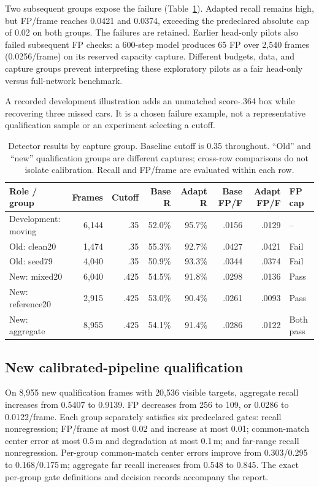 \documentclass[conference]{IEEEtran}
\begin{document}
Two subsequent groups expose the failure (Table~\ref{tab:detector}). Adapted recall remains high, but FP/frame reaches 0.0421 and 0.0374, exceeding the predeclared absolute cap of 0.02 on both groups. The failures are retained. Earlier head-only pilots also failed subsequent FP checks: a 600-step model produces 65 FP over 2,540 frames (0.0256/frame) on its reserved capacity capture. Different budgets, data, and capture groups prevent interpreting these exploratory pilots as a fair head-only versus full-network benchmark.

A recorded development illustration adds an unmatched score-.364 box while recovering three missed cars. It is a chosen failure example, not a representative qualification sample or an experiment selecting a cutoff.

\begin{table}[t]
\caption{Detector results by capture group. Baseline cutoff is 0.35 throughout. ``Old'' and ``new'' qualification groups are different captures; cross-row comparisons do not isolate calibration. Recall and FP/frame are evaluated within each row.}
\label{tab:detector}
\centering\small\setlength{\tabcolsep}{4pt}
\begin{tabular}{lrrrrrrl}
\toprule
Role / group & Frames & Cutoff & Base R & Adapt R & Base FP/F & Adapt FP/F & FP cap\\
\midrule
Development: moving & 6,144 & .35 & 52.0\% & 95.7\% & .0156 & .0129 & --\\
Old: clean20 & 1,474 & .35 & 55.3\% & 92.7\% & .0427 & .0421 & Fail\\
Old: seed79 & 4,040 & .35 & 50.9\% & 93.3\% & .0344 & .0374 & Fail\\
New: mixed20 & 6,040 & .425 & 54.5\% & 91.8\% & .0298 & .0136 & Pass\\
New: reference20 & 2,915 & .425 & 53.0\% & 90.4\% & .0261 & .0093 & Pass\\
New: aggregate & 8,955 & .425 & 54.1\% & 91.4\% & .0286 & .0122 & Both pass\\
\bottomrule
\end{tabular}
\end{table}

\subsection{New calibrated-pipeline qualification}
On 8,955 new qualification frames with 20,536 visible targets, aggregate recall increases from 0.5407 to 0.9139. FP decreases from 256 to 109, or 0.0286 to 0.0122/frame. Each group separately satisfies six predeclared gates: recall nonregression; FP/frame at most 0.02 and increase at most 0.01; common-match center error at most 0.5\,m and degradation at most 0.1\,m; and far-range recall nonregression. Per-group common-match center errors improve from 0.303/0.295 to 0.168/0.175\,m; aggregate far recall increases from 0.548 to 0.845. The exact per-group gate definitions and decision records accompany the report.
\end{document}
